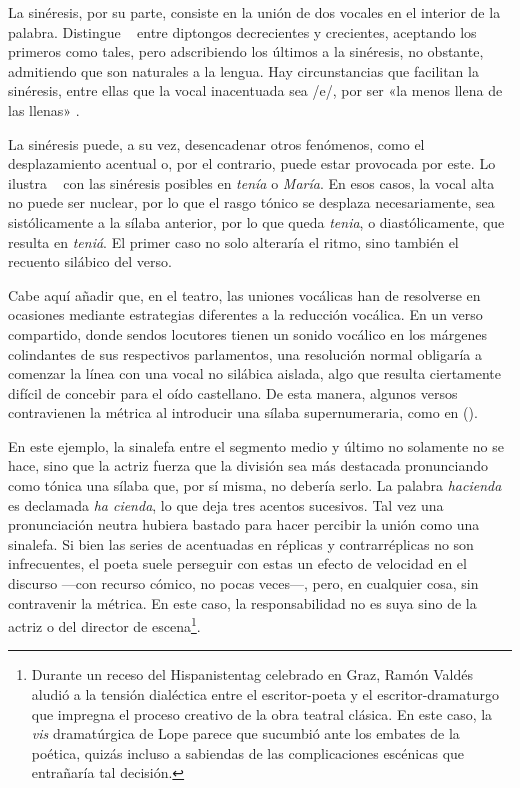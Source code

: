 La sinéresis, por su parte, consiste en la unión de dos vocales en el interior de la palabra. Distingue \citeauthor{diazrengifo2012}~\parencite*[187-188]{diazrengifo2012} entre diptongos decrecientes y crecientes, aceptando los primeros como tales, pero adscribiendo los últimos a la sinéresis, no obstante, admitiendo que son naturales a la lengua. Hay circunstancias que facilitan la sinéresis, entre ellas que la vocal inacentuada sea /e/, por ser «la menos llena de las llenas» \parencite[88]{bello1981}.

La sinéresis puede, a su vez, desencadenar otros fenómenos, como el desplazamiento acentual o, por el contrario, puede estar provocada por este. Lo ilustra \citeauthor{sanchez2020}~\parencite*[303-304]{sanchez2020} con las sinéresis posibles en \textit{tenía} o \textit{María}. En esos casos, la vocal alta no puede ser nuclear, por lo que el rasgo tónico se desplaza necesariamente, sea sistólicamente a la sílaba anterior, por lo que queda \textit{tenia}, o diastólicamente, que resulta en \textit{teniá}. El primer caso no solo alteraría el ritmo, sino también el recuento silábico del verso.

Cabe aquí añadir que, en el teatro, las uniones vocálicas han de resolverse en ocasiones mediante estrategias diferentes a la reducción vocálica. En un verso compartido, donde sendos locutores tienen un sonido vocálico en los márgenes colindantes de sus respectivos parlamentos, una resolución normal obligaría a comenzar la línea con una vocal no silábica aislada, algo que resulta ciertamente difícil de concebir para el oído castellano. De esta manera, algunos versos contravienen la métrica al introducir una sílaba supernumeraria, como en ().

En este ejemplo, la sinalefa entre el segmento medio y último no solamente no se hace, sino que la actriz fuerza que la división sea más destacada pronunciando como tónica una sílaba que, por sí misma, no debería serlo. La palabra \textit{hacienda} es declamada \textit{ha cienda}, lo que deja tres acentos sucesivos. Tal vez una pronunciación neutra hubiera bastado para hacer percibir la unión como una sinalefa. Si bien las series de acentuadas en réplicas y contrarréplicas no son infrecuentes, el poeta suele perseguir con estas un efecto de velocidad en el discurso —con recurso cómico, no pocas veces—, pero, en cualquier cosa, sin contravenir la métrica. En este caso, la responsabilidad no es suya sino de la actriz o del director de escena\footnote{Durante un receso del Hispanistentag celebrado en Graz, Ramón Valdés aludió a la tensión dialéctica entre el escritor-poeta y el escritor-dramaturgo que impregna el proceso creativo de la obra teatral clásica. En este caso, la \textit{vis} dramatúrgica de Lope parece que sucumbió ante los embates de la poética, quizás incluso a sabiendas de las complicaciones escénicas que entrañaría tal decisión.}.

